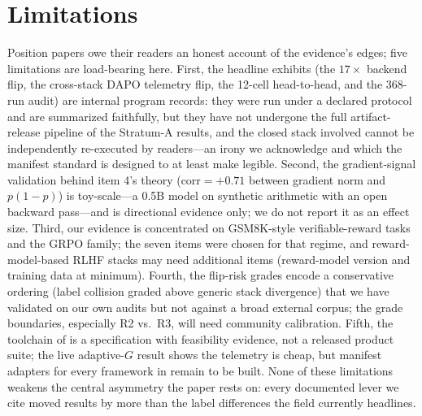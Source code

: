 \section{Limitations}
\label{sec:p5-limitations}
Position papers owe their readers an honest account of the evidence's edges;
five limitations are load-bearing here. First, the headline exhibits
(the $17\times$ backend flip, the cross-stack DAPO telemetry flip, the
12-cell head-to-head, and the 368-run audit) are internal program records:
they were run under a declared protocol and are summarized faithfully, but
they have not undergone the full artifact-release pipeline of the \ours{}
Stratum-A results, and the closed stack involved cannot be independently
re-executed by readers---an irony we acknowledge and which the manifest
standard is designed to at least make legible. Second, the gradient-signal
validation behind item 4's theory ($\mathrm{corr} = +0.71$ between gradient
norm and $p(1-p)$) is toy-scale---a 0.5B model on synthetic arithmetic with
an open backward pass---and is directional evidence only; we do not report it
as an effect size. Third, our evidence is concentrated on GSM8K-style
verifiable-reward tasks and the GRPO family; the seven items were chosen for
that regime, and reward-model-based RLHF stacks may need additional items
(reward-model version and training data at minimum). Fourth, the flip-risk
grades encode a conservative ordering (label collision graded above generic
stack divergence) that we have validated on our own audits but not against a
broad external corpus; the grade boundaries, especially R2 vs.\ R3, will need
community calibration. Fifth, the toolchain of  is a
specification with feasibility evidence, not a released product suite; the
live adaptive-$G$ result shows the telemetry is cheap, but manifest adapters
for every framework in  remain to be built.
None of these limitations weakens the central asymmetry the paper rests on:
every documented lever we cite moved results by more than the label
differences the field currently headlines.
